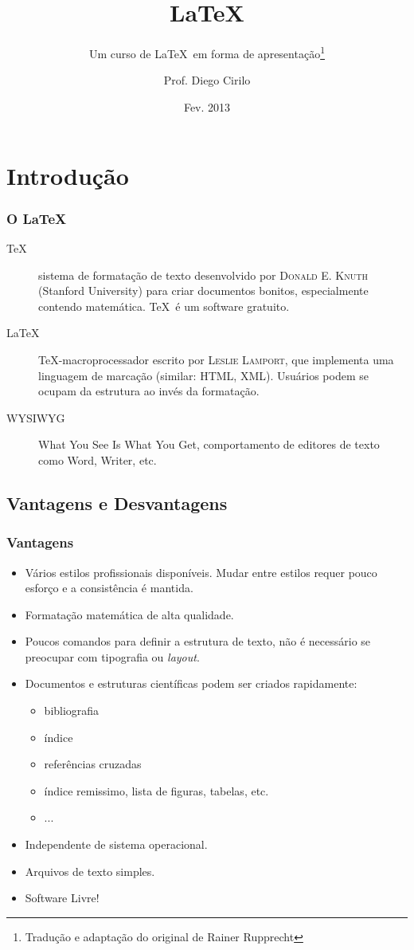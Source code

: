 \documentclass[10pt]{beamer}
\title{\LaTeX}
\subtitle{Um curso de \LaTeX\ em forma de apresentação\footnote{Tradução e adaptação do original de Rainer Rupprecht}}
\institute{IFRN - Campus Pau dos Ferros}
\author{Prof. Diego Cirilo}
\date{Fev. 2013}
\begin{document}
\frame{\titlepage}

\section{Introdução}
\begin{frame}
  \frametitle{O \LaTeX}
  \begin{description}
    \item[\TeX]{sistema de formatação de texto desenvolvido por
        \textsc{Donald E. Knuth} (Stanford University) para criar documentos
        bonitos, especialmente contendo matemática. \TeX\ é um software gratuito.}
    \item[\LaTeX]{\TeX -macroprocessador escrito por \textsc{Leslie
        Lamport}, que implementa uma linguagem de marcação (similar: HTML, XML).
      Usuários podem se ocupam da estrutura ao invés da formatação.}
    \item[WYSIWYG]{What You See Is What You Get, comportamento de editores de texto
      como Word, Writer, etc.}
  \end{description}
\end{frame}

\subsection{Vantagens e Desvantagens}

\begin{frame}
  \frametitle{Vantagens}
  \begin{itemize}
     \item{Vários estilos profissionais disponíveis.
         Mudar entre estilos requer pouco esforço e a consistência é mantida.}
     \item{Formatação matemática de alta qualidade.}
     \item{Poucos comandos para definir a estrutura de texto, não é necessário se
       preocupar com tipografia ou \textit{layout}.}
     \item{Documentos e estruturas científicas podem ser criados rapidamente:
         \begin{itemize}
           \item{bibliografia}
           \item{índice}
           \item{referências cruzadas}
           \item{índice remissimo, lista de figuras, tabelas, etc.}
           \item{...}
         \end{itemize} }
     \item{Independente de sistema operacional.}
     \item{Arquivos de texto simples.}
     \item{Software Livre!}
  \end{itemize}
\end{frame}
\end{document}
